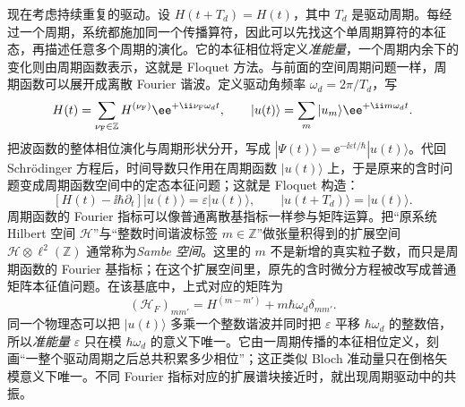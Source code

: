 现在考虑持续重复的驱动。设 $H(t+T_d)=H(t)$，其中 $T_d$ 是驱动周期。每经过一个周期，系统都施加同一个传播算符，因此可以先找这个单周期算符的本征态，再描述任意多个周期的演化。它的本征相位将定义\emph{准能量}，一个周期内余下的变化则由周期函数表示，这就是 Floquet 方法。与前面的空间周期问题一样，周期函数可以展开成离散 Fourier 谐波。定义驱动角频率 $\omega_d=2\pi/T_d$，写
\begin{equation*}
H(t)=\sum_{\nu_{\rm F}\in\mathbb Z}H^{(\nu_{\rm F})}\ee^{+\ii\nu_{\rm F}\omega_d t},
\qquad
|u(t)\rangle=\sum_m|u_m\rangle \ee^{+\ii m\omega_d t}.
\end{equation*}
把波函数的整体相位演化与周期形状分开，写成 $|\Psi(t)\rangle=\ee^{-\ii\varepsilon t/\hbar}|u(t)\rangle$。代回 Schr\"odinger 方程后，时间导数只作用在周期函数 $|u(t)\rangle$ 上，于是原来的含时问题变成周期函数空间中的定态本征问题；这就是 Floquet 构造：
\begin{equation}
\boxed{
[H(t)-\ii\hbar\partial_t]|u(t)\rangle
=\varepsilon|u(t)\rangle,
\qquad |u(t+T_d)\rangle=|u(t)\rangle.}
\label{eq:floquet_sambe_eigenproblem}
\end{equation}
周期函数的 Fourier 指标可以像普通离散基指标一样参与矩阵运算。把“原系统 Hilbert 空间 $\mathcal H$”与“整数时间谐波标签 $m\in\mathbb Z$”做张量积得到的扩展空间 $\mathcal H\otimes\ell^2(\mathbb Z)$ 通常称为\emph{Sambe 空间}。这里的 $m$ 不是新增的真实粒子数，而只是周期函数的 Fourier 基指标；在这个扩展空间里，原先的含时微分方程被改写成普通矩阵本征值问题。在该基底中，上式对应的矩阵为
\begin{equation}
\boxed{
(\mathcal H_F)_{mm'}
=H^{(m-m')}+m\hbar\omega_d\delta_{mm'}.}
\label{eq:general_floquet_sambe_operator_periodic_lattice}
\end{equation}
同一个物理态可以把 $|u(t)\rangle$ 多乘一个整数谐波并同时把 $\varepsilon$ 平移 $\hbar\omega_d$ 的整数倍，所以\emph{准能量} $\varepsilon$ 只在模 $\hbar\omega_d$ 的意义下唯一。它由一周期传播的本征相位定义，刻画“一整个驱动周期之后总共积累多少相位”；这正类似 Bloch 准动量只在倒格矢模意义下唯一。不同 Fourier 指标对应的扩展谱块接近时，就出现周期驱动中的共振。

